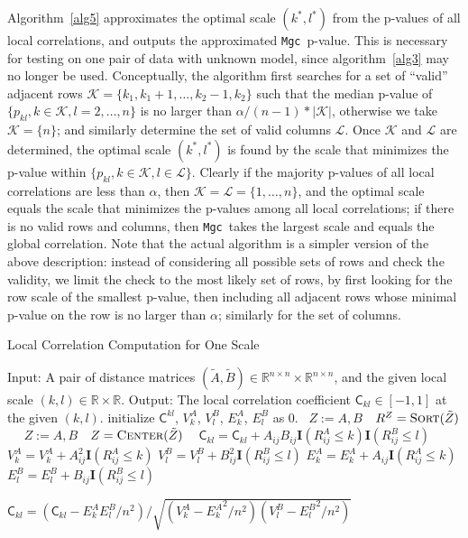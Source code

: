 \documentclass[11pt]{article}
\providecommand{\sct}[1]{{\sc \texttt{#1}}}
\providecommand{\mb}[1]{\boldsymbol{#1}}
\newcommand{\Real}{\mathbb{R}}
\newcommand{\G}{\mathsf{C}}
\newcommand{\K}{\mathcal{K}}
\newcommand{\LL}{\mathcal{L}}
\newcommand{\Linefor}[2]{%
    \State \algorithmicfor\ {#1}\ \algorithmicdo\ {#2} \algorithmicend\ \algorithmicfor%
}
\newcommand{\Mgc}{\sct{Mgc}}
\begin{document}
Algorithm~\ref{alg5} approximates the optimal scale $(k^{*},l^{*})$ from the p-values of all local correlations, and outputs the approximated \Mgc~p-value. This is necessary for testing on one pair of data with unknown model, since algorithm~\ref{alg3} may no longer be used. Conceptually, the algorithm first searches for a set of ``valid'' adjacent rows $\K=\{k_{1},k_{1}+1,\ldots,k_{2}-1,k_{2}\}$ such that the median p-value of $\{p_{kl},k \in \K, l=2,\ldots,n\}$ is no larger than $\alpha /(n-1) * |\K|$, otherwise we take $\K=\{n\}$; and similarly determine the set of valid columns $\LL$. Once $\K$ and $\LL$ are determined, the optimal scale $(k^{*},l^{*})$ is found by the scale that minimizes the p-value within $\{p_{kl},k \in \K, l \in \LL\}$. Clearly if the majority p-values of all local correlations are less than $\alpha$, then $\K=\LL=\{1,\ldots,n\}$, and the optimal scale equals the scale that minimizes the p-values among all local correlations; if there is no valid rows and columns, then \Mgc~takes the largest scale and equals the global correlation. Note that the actual algorithm is a simpler version of the above description: instead of considering all possible sets of rows and check the validity, we limit the check to the most likely set of rows, by first looking for the row scale of the smallest p-value, then including all adjacent rows whose minimal p-value on the row is no larger than $\alpha$; similarly for the set of columns.

\begin{algorithm}
\caption{Local Correlation Computation for One Scale}
\label{alg1}
\begin{algorithmic}[1]
\Statex Input: A pair of distance matrices $(\tilde{A},\tilde{B}) \in \Real^{n \times n} \times \Real^{n \times n}$, and the given local scale $(k,l) \in \Real \times \Real$.
\Statex Output: The local correlation coefficient $\G_{kl} \in [-1,1]$ at the given $(k,l)$.
\State initialize $\G^{kl}$, $V^{A}_{k}$, $V^{B}_{l}$, $E^{A}_{k}$, $E^{B}_{l}$ as $0$.
\Linefor{$Z:=A,B$}{$R^{Z}=\textsc{Sort}(\tilde{Z})$} 
\Linefor{$Z:=A,B$}{$Z=\textsc{Center}(\tilde{Z})$} 
\State $\G_{kl}=\G_{kl}+A_{ij}B_{ij}\mb{I}(R^{A}_{ij} \leq k)\mb{I}(R^{B}_{ij} \leq l)$ 
\State $V^{A}_{k}=V^{A}_{k}+A_{ij}^2\mb{I}(R^{A}_{ij} \leq k)$ 
\State $V^{B}_{l}=V^{B}_{l}+B_{ij}^2\mb{I}(R^{B}_{ij} \leq l)$ 
\State $E^{A}_{k}=E^{A}_{k}+A_{ij}\mb{I}(R^{A}_{ij} \leq k)$ 
\State $E^{B}_{l}=E^{B}_{l}+B_{ij}\mb{I}(R^{B}_{ij} \leq l)$
\EndFor

\State $\G_{kl}=\left(\G_{kl}-E^{A}_{k}E^{B}_{l}/n^2\right)/\sqrt{\left(V^{A}_{k}-{E^{A}_{k}}^2/n^2\right) \left(V^{B}_{l}-{E^{B}_{l}}^2/n^2\right)}$ 

\EndFunction
\end{algorithmic}
\end{algorithm}
\end{document}
